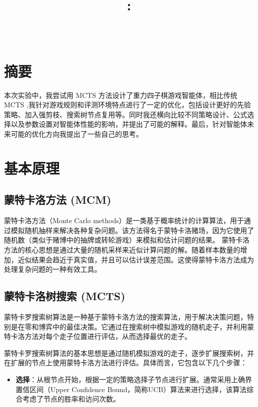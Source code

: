 \documentclass{article}
\title{\textmd{\bf \Class: \Title}}
\author{\textbf{\StudentName}\ \ \StudentClass\ \ \StudentNumber}
\begin{document}
\begin{spacing}{1.1}
\maketitle \thispagestyle{empty}
\section{摘要}
\hspace{1.4em} 本次实验中，我尝试用 MCTS 方法设计了重力四子棋游戏智能体，相比传统 MCTS ,我针对游戏规则和评测环境特点进行了一定的优化，包括设计更好的先验策略、加入强剪枝、搜索树节点复用等。同时我还横向比较不同策略设计、公式选择以及参数设置对智能体性能的影响，并提出了可能的解释。最后，针对智能体未来可能的优化方向我提出了一些自己的思考。

\section{基本原理}
	\subsection{蒙特卡洛方法 (MCM)}
	\hspace{1.4em}
	蒙特卡洛方法（Monte Carlo methods）是一类基于概率统计的计算算法，用于通过模拟随机抽样来解决各种复杂问题。该方法得名于蒙特卡洛赌场，因为它使用了随机数（类似于赌博中的抽牌或转轮游戏）来模拟和估计问题的结果。
	蒙特卡洛方法的核心思想是通过大量的随机采样来近似计算问题的解。随着样本数量的增加，近似结果会趋近于真实值，并且可以估计误差范围。这使得蒙特卡洛方法成为处理复杂问题的一种有效工具。 
	\subsection{蒙特卡洛树搜索 (MCTS)}
	\hspace{1.4em} 
	蒙特卡罗搜索树算法是一种基于蒙特卡洛方法的搜索算法，用于解决决策问题，特别是在零和博弈中的最佳决策。它通过在搜索树中模拟游戏的随机走子，并利用蒙特卡洛方法对每个走子位置进行评估，从而选择最优的走子。
	
	蒙特卡罗搜索树算法的基本思想是通过随机模拟游戏的走子，逐步扩展搜索树，并在扩展的节点上使用蒙特卡洛方法进行评估。具体而言，它包含以下几个步骤：
	\begin{itemize}
	\item \textbf{选择}：从根节点开始，根据一定的策略选择子节点进行扩展。通常采用上确界置信区间（Upper Confidence Bound，简称UCB）算法来进行选择，该算法综合考虑了节点的胜率和访问次数。
	

\end{itemize}
\end{spacing}
\end{document}
